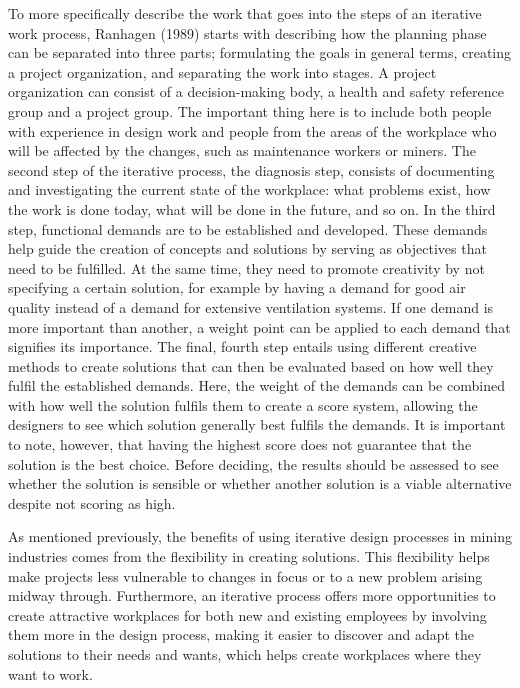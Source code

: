 \documentclass[
  12pt,
]{scrbook}
\begin{document}
To more specifically describe the work that goes into the steps of an iterative work process, Ranhagen (1989) starts with describing how the planning phase can be separated into three parts; formulating the goals in general terms, creating a project organization, and separating the work into stages. A project organization can consist of a decision-making body, a health and safety reference group and a project group. The important thing here is to include both people with experience in design work and people from the areas of the workplace who will be affected by the changes, such as maintenance workers or miners. The second step of the iterative process, the diagnosis step, consists of documenting and investigating the current state of the workplace: what problems exist, how the work is done today, what will be done in the future, and so on. In the third step, functional demands are to be established and developed. These demands help guide the creation of concepts and solutions by serving as objectives that need to be fulfilled. At the same time, they need to promote creativity by not specifying a certain solution, for example by having a demand for good air quality instead of a demand for extensive ventilation systems. If one demand is more important than another, a weight point can be applied to each demand that signifies its importance. The final, fourth step entails using different creative methods to create solutions that can then be evaluated based on how well they fulfil the established demands. Here, the weight of the demands can be combined with how well the solution fulfils them to create a score system, allowing the designers to see which solution generally best fulfils the demands. It is important to note, however, that having the highest score does not guarantee that the solution is the best choice. Before deciding, the results should be assessed to see whether the solution is sensible or whether another solution is a viable alternative despite not scoring as high.

As mentioned previously, the benefits of using iterative design processes in mining industries comes from the flexibility in creating solutions. This flexibility helps make projects less vulnerable to changes in focus or to a new problem arising midway through. Furthermore, an iterative process offers more opportunities to create attractive workplaces for both new and existing employees by involving them more in the design process, making it easier to discover and adapt the solutions to their needs and wants, which helps create workplaces where they want to work.
\end{document}

